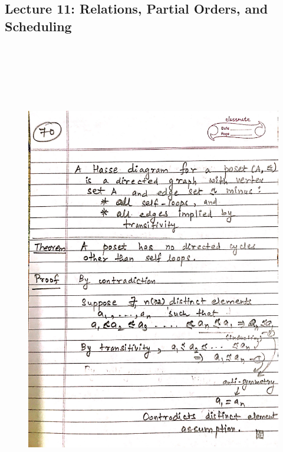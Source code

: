 \newpage
{\color{black} \subsection*{Lecture 11: Relations, Partial Orders, and Scheduling}}
\begin{figure}[H]
    \centering
    \includegraphics[width=16cm, height=21cm]{"./MIT-6.042J/MIT-6042J-070"}
\end{figure}

